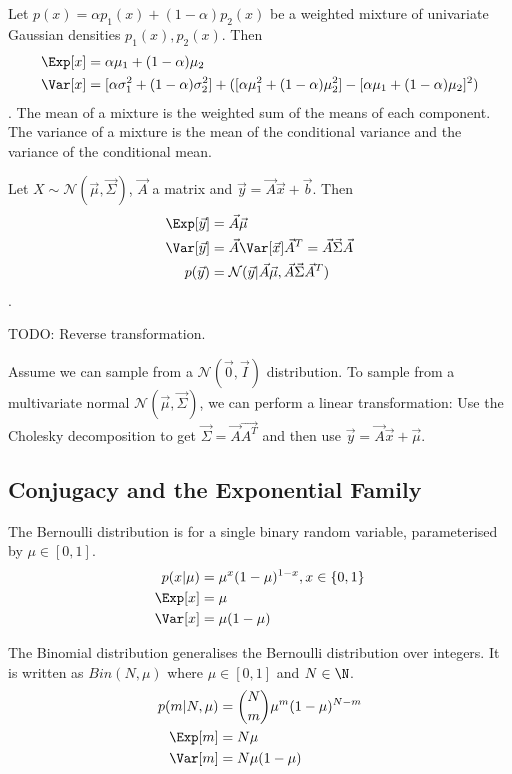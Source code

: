 Let $p(x) = \alpha p_1(x) + (1 - \alpha)p_2(x)$ be a weighted
mixture of univariate Gaussian densities $p_1(x), p_2(x)$.
Then
\begin{align*}
    \Exp[x] &= \alpha \mu_1 + (1 - \alpha) \mu_2 \\
    \Var[x] &= [\alpha \sigma_1^2 + (1 - \alpha) \sigma_2^2] +
    ([\alpha \mu_1^2 + (1 - \alpha) \mu_2^2] - [\alpha \mu_1 + (1 - \alpha) \mu_2]^2)
\end{align*}.
The mean of a mixture is the weighted sum of the means of each component.
The variance of a mixture is the mean of the conditional variance and
the variance of the conditional mean.

Let $X \sim \mathcal{N}(\vec{\mu}, \vec{\Sigma})$, $\vec{A}$ a matrix
and $\vec{y} = \vec{A}\vec{x} + \vec{b}$.
Then
\begin{align*}
    \Exp[\vec{y}] &= \vec{A} \vec{\mu} \\
    \Var[\vec{y}] &= \vec{A} \Var[\vec{x}] \vec{A}^T = \vec{A} \vec{\Sigma} \vec{A} \\
    p(\vec{y}) &= \mathcal{N}(\vec{y} | \vec{A}\vec{\mu}, \vec{A} \vec{\Sigma} \vec{A}^T)
\end{align*}.

TODO: Reverse transformation.

Assume we can sample from a $\mathcal{N}(\vec{0}, \vec{I})$ distribution.
To sample from a multivariate normal $\mathcal{N}(\vec{\mu}, \vec{\Sigma})$,
we can perform a linear transformation:
Use the Cholesky decomposition to get $\vec{\Sigma} = \vec{A}\vec{A^T}$
and then use $\vec{y} = \vec{A}\vec{x} + \vec{\mu}$.


\subsection{Conjugacy and the Exponential Family}
The Bernoulli distribution is for a single binary random variable,
parameterised by $\mu \in [0, 1]$.
\begin{align*}
    p(x | \mu) &= \mu^x (1 - \mu)^{1 - x}, x \in \{0, 1\} \\
    \Exp[x] &= \mu \\
    \Var[x] &= \mu (1 - \mu)
\end{align*}

The Binomial distribution generalises the Bernoulli distribution over
integers. It is written as $Bin(N, \mu)$ where
$\mu \in [0, 1]$ and $N \in \N$.
\begin{align*}
    p(m | N, \mu) &= \binom{N}{m} \mu^m (1 - \mu)^{N - m} \\
    \Exp[m] &= N \mu \\
    \Var[m] &= N \mu (1 - \mu)
\end{align*}

